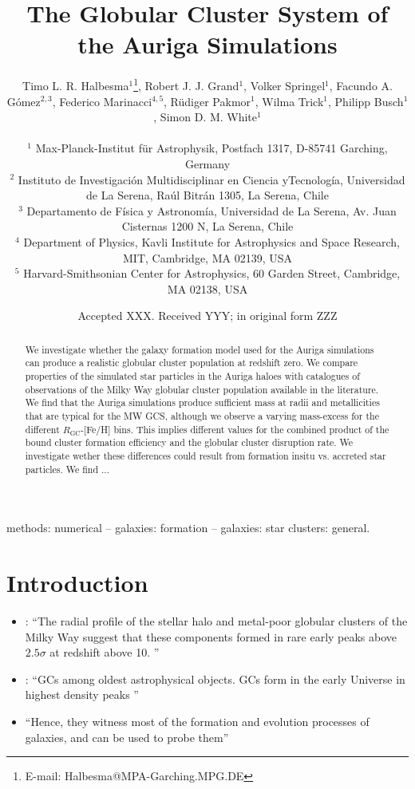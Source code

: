 \documentclass[a4paper,fleqn,usenatbib]{mnras}
\title[Auriga GCS]{The Globular Cluster System of the Auriga Simulations}
\author[T. L. R. Halbesma et al.]{\parbox[t]{\textwidth}{
    Timo L. R. Halbesma$^{1}$\thanks{E-mail: Halbesma@MPA-Garching.MPG.DE},
    Robert J. J. Grand$^{1}$, 
    Volker Springel$^{1}$, 
    Facundo A. G\'{o}mez$^{2,3}$, 
    Federico Marinacci$^{4,5}$,
    R\"{u}diger Pakmor$^{1}$, 
    Wilma Trick$^{1}$,
    Philipp Busch$^{1}$,
    Simon D. M. White$^{1}$
} \vspace{10pt} \\
$^{1}$ Max-Planck-Institut f\"ur Astrophysik, Postfach 1317, D-85741 Garching, Germany \\
$^{2}$ Instituto de Investigaci\'{o}n Multidisciplinar en Ciencia yTecnolog\'{i}a, 
    Universidad de La Serena, Ra\'{u}l Bitr\'{a}n 1305, La Serena, Chile \\
$^{3}$ Departamento de F\'{i}sica y Astronom\'{i}a, Universidad de La Serena, Av.
    Juan Cisternas 1200 N, La Serena, Chile \\
$^{4}$ Department of Physics, Kavli Institute for Astrophysics and Space Research,
    MIT, Cambridge, MA 02139, USA \\
$^{5}$ Harvard-Smithsonian Center for Astrophysics, 60 Garden Street, Cambridge,
    MA 02138, USA \\
}
\date{Accepted XXX. Received YYY; in original form ZZZ}
\begin{document}
\label{firstpage}
\pagerange{\pageref{firstpage}--\pageref{lastpage}}
\maketitle

\begin{abstract}
We investigate whether the galaxy formation model used for the Auriga simulations 
can produce a realistic globular cluster population at redshift zero. We compare
properties of the simulated star particles in the Auriga haloes with
catalogues of observations of the Milky Way globular cluster population available
in the literature. We find that the Auriga simulations produce sufficient mass
at radii and metallicities that are typical for the MW GCS, although we observe
a varying mass-excess for the different $R_{\text{GC}}$-[Fe/H] bins. This implies
different values for the combined product of the bound cluster formation efficiency
and the globular cluster disruption rate. We investigate wether these differences
could result from formation insitu vs. accreted star particles. We find ...
\end{abstract}

\begin{keywords}
methods: numerical -- galaxies: formation -- galaxies: star clusters: general.
\end{keywords}



\section{Introduction}





\begin{itemize}
    \item \citet{2005MNRAS.364..367D}: ``The radial profile of the stellar halo
    and metal-poor globular clusters of the Milky Way suggest that these components 
    formed in rare early peaks above $2.5 \sigma$ at redshift above 10. ''

    \item \citet{2017MNRAS.465.3622R}: ``GCs among oldest astrophysical objects.
    GCs form in the early Universe in highest density peaks
    \citep[e.g.][]{2005MNRAS.364..367D, 2009ApJ...706L.192B}''

    \item ``Hence, they witness most of the formation and evolution processes
    of galaxies, and can be used to probe them'' \citep{2006ARA&A..44..193B}
\end{itemize}
\end{document}
